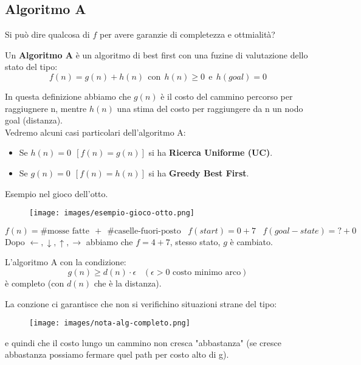 \subsection{Algoritmo A}
Si può dire qualcosa di $f$ per avere garanzie di completezza e ottmialità?
\begin{definition}
    Un \textbf{Algoritmo A} è un algoritmo di best first con una fuzine di valutazione dello stato del tipo:
    $$f(n) = g(n) + h(n) \:\: \text{con}\:\: h(n) \geq 0 \:\: \text{e}\:\: h(goal) = 0$$
\end{definition}
In questa definizione abbiamo che $g(n)$ è il costo del cammino percorso per raggiugnere n, mentre $h(n)$ una
stima del costo per raggiungere da n un nodo goal (distanza).\\
Vedremo alcuni casi particolari dell'algoritmo A:
\begin{itemize}
    \item Se $h(n) = 0 \:\:[f(n) = g(n)]$ si ha \textbf{Ricerca Uniforme (UC)}.
    \item Se $g(n) = 0 \:\:[f(n) = h(n)]$ si ha \textbf{Greedy Best First}.
\end{itemize}
\begin{example}
    Esempio nel gioco dell'otto.
    \begin{figure}[h!]
        \centering
        \texttt{[image: images/esempio-gioco-otto.png]}
    \end{figure}

    \hspace{-15pt}$f(n) = \#\text{mosse fatte} \:\: + \:\: \#\text{caselle-fuori-posto} \hspace{10pt} f(start) = 0 + 7 \hspace{10pt} f(goal-state) = ? + 0$\\
    Dopo $\leftarrow, \downarrow, \uparrow, \rightarrow$ abbiamo che $f = 4 + 7$, stesso stato, $g$ è cambiato.
\end{example}
\begin{theorem}
    L'algoritmo A con la condizione:
    $$g(n) \geq d(n) \cdot \epsilon \hspace{10pt}(\epsilon >0 \text{ costo minimo arco})$$
    è completo (con $d(n)$ che è la distanza).
\end{theorem}
\begin{note}
    La conzione ci garantisce che non si verifichino situazioni strane del tipo:
    \begin{figure}[h!]
        \centering
        \texttt{[image: images/nota-alg-completo.png]}
    \end{figure}
    e quindi che il costo lungo un cammino non cresca "abbastanza" (se cresce abbastanza possiamo fermare quel path per costo alto di g).
\end{note}
